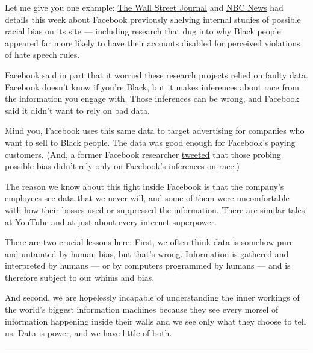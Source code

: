 Let me give you one example:
\href{https://www.wsj.com/articles/facebook-creates-teams-to-study-racial-bias-on-its-platforms-11595362939}{The
Wall Street Journal} and
\href{https://www.nbcnews.com/tech/tech-news/facebook-management-ignored-internal-research-showing-racial-bias-current-former-n1234746}{NBC
News} had details this week about Facebook previously shelving internal
studies of possible racial bias on its site --- including research that
dug into why Black people appeared far more likely to have their
accounts disabled for perceived violations of hate speech rules.

Facebook said in part that it worried these research projects relied on
faulty data. Facebook doesn't know if you're Black, but it makes
inferences about race from the information you engage with. Those
inferences can be wrong, and Facebook said it didn't want to rely on bad
data.

Mind you, Facebook uses this same data to target advertising for
companies who want to sell to Black people. The data was good enough for
Facebook's paying customers. (And, a former Facebook researcher
\href{https://twitter.com/dantley/status/1286519635748114432}{tweeted}
that those probing possible bias didn't rely only on Facebook's
inferences on race.)

The reason we know about this fight inside Facebook is that the
company's employees see data that we never will, and some of them were
uncomfortable with how their bosses used or suppressed the information.
There are similar tales
\href{https://www.theguardian.com/technology/2018/feb/02/youtube-algorithm-election-clinton-trump-guillaume-chaslot}{at
YouTube} and at just about every internet superpower.

There are two crucial lessons here: First, we often think data is
somehow pure and untainted by human bias, but that's wrong. Information
is gathered and interpreted by humans --- or by computers programmed by
humans --- and is therefore subject to our whims and bias.

And second, we are hopelessly incapable of understanding the inner
workings of the world's biggest information machines because they see
every morsel of information happening inside their walls and we see only
what they choose to tell us. Data is power, and we have little of both.

\begin{center}\rule{0.5\linewidth}{\linethickness}\end{center}

